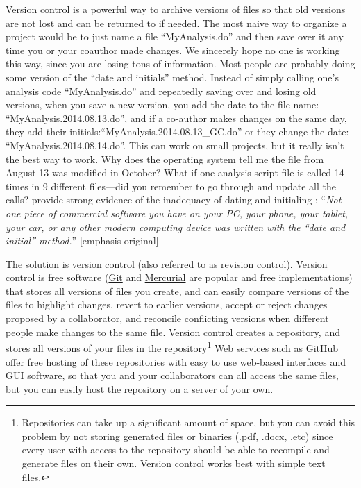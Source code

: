 \documentclass[12pt] {article}
\begin{document}
Version control is a powerful way to archive versions of files so that old versions are not lost and can be returned
to if needed. The most naive way to organize a project would be to just name a file ``MyAnalysis.do'' and then save over it any time you or your coauthor made changes. We sincerely hope no one is working this way, since you are losing tons of information. Most people are probably doing some version of the ``date and initials'' method. Instead of simply calling one's analysis code ``MyAnalysis.do'' and repeatedly saving over and losing old versions, when you save a new version, you add the date to the file name: ``MyAnalysis.2014.08.13.do'', and if a co-author makes changes on the same day, they add their initials:``MyAnalysis.2014.08.13\_GC.do'' or they change the date: ``MyAnalysis.2014.08.14.do''. This can work on small projects, but it really isn't the best way to work. Why does the operating system tell me the file from August 13 was modified in October? What if one analysis script file is called 14 times in 9 different files---did you remember to go through and update all the calls? \cite{GentzkowShapiro} provide strong evidence of the inadequacy of dating and initialing : ``\textit{Not one piece of commercial software you have on your PC, your phone, your tablet, your car, or any other modern computing device was written with the ``date and initial'' method.}'' [emphasis original]

The solution is version control (also referred to as revision control). Version control is free software (\href{https://git-scm.com/book/en/v2/Getting-Started-About-Version-Control}{Git} and \href{https://mercurial.selenic.com/}{Mercurial} are popular and free implementations) that stores all versions of files you create, and can easily compare versions of the files to highlight changes, revert to earlier versions, accept or reject changes proposed by a collaborator, and reconcile conflicting versions when different people make changes to the same file. Version control creates a repository, and stores all versions of your files in the repository\footnote{Repositories can take up a significant amount of space, but you can avoid this problem by not storing generated files or binaries (.pdf, .docx, .etc) since every user with access to the repository should be able to recompile and generate files on their own. Version control works best with simple text files.}  Web services
such as \href{http:www.github.com}{GitHub} offer free hosting of these repositories with easy to use web-based interfaces and GUI software, so that you and your collaborators can all access the same files, but you can easily host the repository on a server of your own. 
\end{document}
